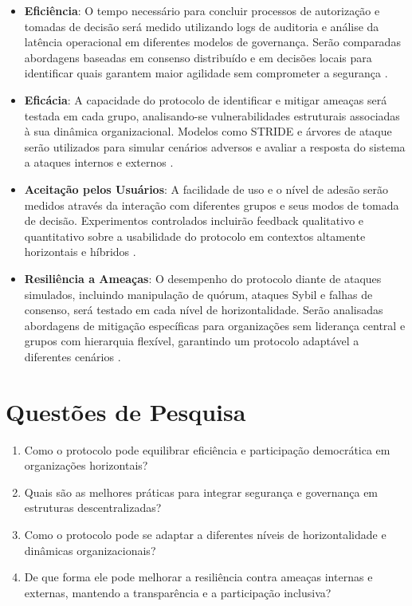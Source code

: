 \begin{itemize}

    \item \textbf{Eficiência}: O tempo necessário para concluir processos de autorização e
tomadas de decisão será medido utilizando logs de auditoria e análise da
latência operacional em diferentes modelos de governança. Serão comparadas
abordagens baseadas em consenso distribuído e em decisões locais para
identificar quais garantem maior agilidade sem comprometer a segurança \cite{RiskCentricThreatModeling}.

    \item \textbf{Eficácia}: A capacidade do protocolo de identificar e mitigar ameaças
será testada em cada grupo, analisando-se vulnerabilidades estruturais
associadas à sua dinâmica organizacional. Modelos como STRIDE e árvores de
ataque serão utilizados para simular cenários adversos e avaliar a resposta do
sistema a ataques internos e externos \cite{STRIDEthreatmodelingforcyberphysical, AttackTrees}.

    \item \textbf{Aceitação pelos Usuários}: A facilidade de uso e o nível de adesão serão
medidos através da interação com diferentes grupos e seus modos de tomada de
decisão. Experimentos controlados incluirão feedback qualitativo e quantitativo
sobre a usabilidade do protocolo em contextos altamente horizontais e híbridos
\cite{ParticipatoryThreatModelling}.

    \item \textbf{Resiliência a Ameaças}: O desempenho do protocolo diante de ataques
simulados, incluindo manipulação de quórum, ataques Sybil e falhas de consenso,
será testado em cada nível de horizontalidade. Serão analisadas abordagens de
mitigação específicas para organizações sem liderança central e grupos com
hierarquia flexível, garantindo um protocolo adaptável a diferentes cenários
\cite{MitigationSybilAttack}.

\end{itemize}

\section{Questões de Pesquisa}
\label{sec:research_questions}

\begin{enumerate}
    \item Como o protocolo pode equilibrar eficiência e participação
democrática em organizações horizontais?
    \item Quais são as melhores práticas para integrar segurança e
governança em estruturas descentralizadas?
    \item Como o protocolo pode se adaptar a diferentes níveis de
horizontalidade e dinâmicas organizacionais?
    \item De que forma ele pode melhorar a resiliência contra ameaças
internas e externas, mantendo a transparência e a participação
inclusiva?
\end{enumerate}

